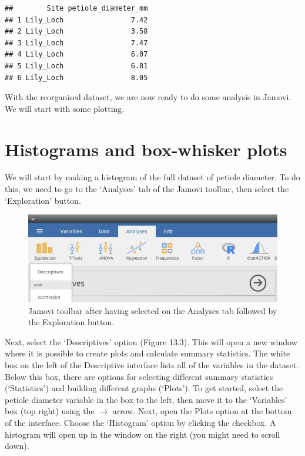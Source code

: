 \documentclass[
]{scrbook}
\begin{document}
\begin{verbatim}
##        Site petiole_diameter_mm
## 1 Lily_Loch                7.42
## 2 Lily_Loch                3.58
## 3 Lily_Loch                7.47
## 4 Lily_Loch                6.07
## 5 Lily_Loch                6.81
## 6 Lily_Loch                8.05
\end{verbatim}

With the reorganised dataset, we are now ready to do some analysis in Jamovi.
We will start with some plotting.

\hypertarget{histograms-and-box-whisker-plots}{%
\section{Histograms and box-whisker plots}\label{histograms-and-box-whisker-plots}}

We will start by making a histogram of the full dataset of petiole diameter.
To do this, we need to go to the `Analyses' tab of the Jamovi toolbar, then select the `Exploration' button.

\begin{figure}
\includegraphics[width=1\linewidth]{img/lilypad_descriptives} \caption{Jamovi toolbar after having selected on the Analyses tab followed by the Exploration button.}\label{fig:unnamed-chunk-47}
\end{figure}

Next, select the `Descriptives' option (Figure 13.3).
This will open a new window where it is possible to create plots and calculate summary statistics.
The white box on the left of the Descriptive interface lists all of the variables in the dataset.
Below this box, there are options for selecting different summary statistics (`Statistics') and building different graphs (`Plots').
To get started, select the petiole diameter variable in the box to the left, then move it to the `Variables' box (top right) using the \(\to\) arrow.
Next, open the Plots option at the bottom of the interface.
Choose the `Histogram' option by clicking the checkbox.
A histogram will open up in the window on the right (you might need to scroll down).
\end{document}
